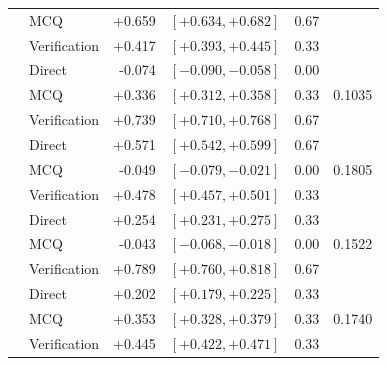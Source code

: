 \documentclass[11pt]{article}
\begin{document}
\begin{table}[H]
\begin{tabular}{llrlrr}
 & MCQ & +0.659 & \([+0.634,+0.682]\) & 0.67 & \\
 & Verification & +0.417 & \([+0.393,+0.445]\) & 0.33 & \\
\addlinespace
\multirow{3}{*}{\(0-1-2\)} & Direct & -0.074 & \([-0.090,-0.058]\) & 0.00 & \multirow{3}{*}{0.1035} \\
 & MCQ & +0.336 & \([+0.312,+0.358]\) & 0.33 & \\
 & Verification & +0.739 & \([+0.710,+0.768]\) & 0.67 & \\
\addlinespace
\multirow{3}{*}{\(2-0-1\)} & Direct & +0.571 & \([+0.542,+0.599]\) & 0.67 & \multirow{3}{*}{0.1805} \\
 & MCQ & -0.049 & \([-0.079,-0.021]\) & 0.00 & \\
 & Verification & +0.478 & \([+0.457,+0.501]\) & 0.33 & \\
\addlinespace
\multirow{3}{*}{\(1-0-2\)} & Direct & +0.254 & \([+0.231,+0.275]\) & 0.33 & \multirow{3}{*}{0.1522} \\
 & MCQ & -0.043 & \([-0.068,-0.018]\) & 0.00 & \\
 & Verification & +0.789 & \([+0.760,+0.818]\) & 0.67 & \\
\addlinespace
\multirow{3}{*}{\(1-1-1\)} & Direct & +0.202 & \([+0.179,+0.225]\) & 0.33 & \multirow{3}{*}{0.1740} \\
 & MCQ & +0.353 & \([+0.328,+0.379]\) & 0.33 & \\
 & Verification & +0.445 & \([+0.422,+0.471]\) & 0.33 & \\
\bottomrule
\end{tabular}
\end{table}
\end{document}
